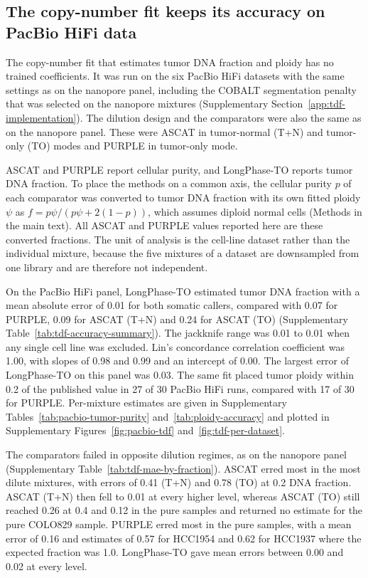 \documentclass[pdflatex,sn-nature]{sn-jnl}
\begin{document}
\subsection{The copy-number fit keeps its accuracy on PacBio HiFi data}\label{supp:pacbio-tdf}

The copy-number fit that estimates tumor DNA fraction and ploidy has no trained coefficients. It was run on the six PacBio HiFi datasets with the same settings as on the nanopore panel, including the COBALT segmentation penalty that was selected on the nanopore mixtures (Supplementary Section~\ref{app:tdf-implementation}). The dilution design and the comparators were also the same as on the nanopore panel. These were ASCAT in tumor-normal (T+N) and tumor-only (TO) modes and PURPLE in tumor-only mode.

ASCAT and PURPLE report cellular purity, and LongPhase-TO reports tumor DNA fraction. To place the methods on a common axis, the cellular purity $p$ of each comparator was converted to tumor DNA fraction with its own fitted ploidy $\psi$ as $f = p\psi/(p\psi + 2(1-p))$, which assumes diploid normal cells (Methods in the main text). All ASCAT and PURPLE values reported here are these converted fractions. The unit of analysis is the cell-line dataset rather than the individual mixture, because the five mixtures of a dataset are downsampled from one library and are therefore not independent.

On the PacBio HiFi panel, LongPhase-TO estimated tumor DNA fraction with a mean absolute error of 0.01 for both somatic callers, compared with 0.07 for PURPLE, 0.09 for ASCAT (T+N) and 0.24 for ASCAT (TO) (Supplementary Table~\ref{tab:tdf-accuracy-summary}). The jackknife range was 0.01 to 0.01 when any single cell line was excluded. Lin's concordance correlation coefficient was 1.00, with slopes of 0.98 and 0.99 and an intercept of 0.00. The largest error of LongPhase-TO on this panel was 0.03. The same fit placed tumor ploidy within 0.2 of the published value in 27 of 30 PacBio HiFi runs, compared with 17 of 30 for PURPLE. Per-mixture estimates are given in Supplementary Tables~\ref{tab:pacbio-tumor-purity} and~\ref{tab:ploidy-accuracy} and plotted in Supplementary Figures~\ref{fig:pacbio-tdf} and~\ref{fig:tdf-per-dataset}.

The comparators failed in opposite dilution regimes, as on the nanopore panel (Supplementary Table~\ref{tab:tdf-mae-by-fraction}). ASCAT erred most in the most dilute mixtures, with errors of 0.41 (T+N) and 0.78 (TO) at 0.2 DNA fraction. ASCAT (T+N) then fell to 0.01 at every higher level, whereas ASCAT (TO) still reached 0.26 at 0.4 and 0.12 in the pure samples and returned no estimate for the pure COLO829 sample. PURPLE erred most in the pure samples, with a mean error of 0.16 and estimates of 0.57 for HCC1954 and 0.62 for HCC1937 where the expected fraction was 1.0. LongPhase-TO gave mean errors between 0.00 and 0.02 at every level.
\end{document}
